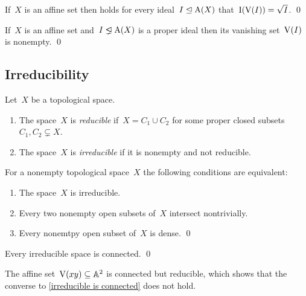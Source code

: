 \begin{theorem}
  \label{nullstellensatz 1}
  If~$X$ is an affine set then holds for every ideal~$I \trianglelefteq \operatorname{A}(X)$ that~$\operatorname{I}( \operatorname{V}( I ) ) = \sqrt{I}$.
  \qed
\end{theorem}


\begin{theorem}
  \label{nullstellensatz 2}
  If~$X$ is an affine set and~$I \ideallneq \coord(X)$ is a proper ideal then its vanishing set~$\operatorname{V}(I)$ is nonempty.
  \qed
\end{theorem}



\subsection{Irreducibility}


\begin{definition}
  Let~$X$ be a topological space.
  \begin{enumerate}
    \item
      The space~$X$ is \emph{reducible} if~$X = C_1 \cup C_2$ for some proper closed subsets~$C_1, C_2 \subsetneq X$.
    \item
      The space~$X$ is \emph{irreducible} if it is nonempty and not reducible.
  \end{enumerate}
\end{definition}


\begin{lemma}
  For a nonempty topological space~$X$ the following conditions are equivalent:
  \begin{enumerate}
    \item
      The space~$X$ is irreducible.
    \item
      Every two nonempty open subsets of~$X$ intersect nontrivially.
    \item
      Every nonemtpy open subset of~$X$ is dense.
    \qed
  \end{enumerate}
\end{lemma}


\begin{lemma}
  \label{irreducible is connected}
  Every irreducible space is connected.
  \qed
\end{lemma}


\begin{example}
  The affine set~$\operatorname{V}(xy) \subseteq \mathbb{A}^2$ is connected but reducible, which shows that the converse to \cref{irreducible is connected} does not hold.
\end{example}


